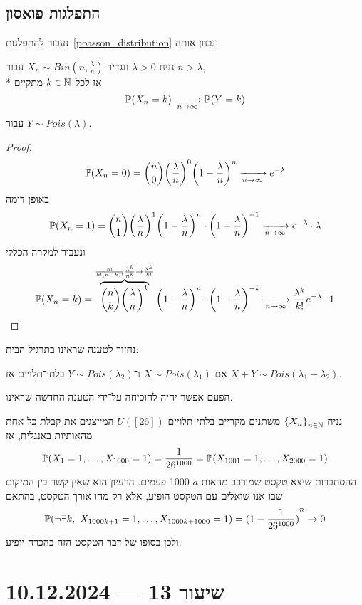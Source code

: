 \subsection{התפלגות פואסון}
נעבור להתפלגות\ \ref{poasson_distribution} ונבחן אותה
\begin{proposition}
	נניח $\lambda > 0$ ונגדיר $X_n \sim Bin(n, \frac{\lambda}{n})$ עבור $n > \lambda$, \\*
	אז לכל $k \in \mathbb{N}$ מתקיים
	\[
		\mathbb{P}(X_n = k) \xrightarrow[n \to \infty]{} \mathbb{P}(Y = k)
	\]
	עבור $Y \sim Pois(\lambda)$.
\end{proposition}
\begin{proof}
	\[
		\mathbb{P}(X_n = 0)
		= \binom{n}{0} {\left(\frac{\lambda}{n}\right)}^0 {\left(1 - \frac{\lambda}{n}\right)}^n \xrightarrow[n \to \infty]{} e^{-\lambda}
	\]
	באופן דומה
	\[
		\mathbb{P}(X_n = 1)
		= \binom{n}{1} {\left(\frac{\lambda}{n}\right)}^1 {\left(1 - \frac{\lambda}{n}\right)}^n \cdot {\left(1 - \frac{\lambda}{n}\right)}^{-1} \xrightarrow[n \to \infty]{} e^{-\lambda} \cdot \lambda
	\]
	ונעבור למקרה הכללי
	\[
		\mathbb{P}(X_n = k)
		= \overbrace{\binom{n}{k} {\left(\frac{\lambda}{n}\right)}^k}^{\frac{n!}{k! (n - k)!} \frac{\lambda^k}{n^k} \to \frac{\lambda^k}{k!}} {\left(1 - \frac{\lambda}{n}\right)}^n \cdot {\left(1 - \frac{\lambda}{n}\right)}^{-k}
		\xrightarrow[n \to \infty]{} \frac{\lambda^k}{k!} e^{-\lambda} \cdot 1
	\]
\end{proof}
נחזור לטענה שראינו בתרגיל הבית:
\begin{proposition}
	אם $X \sim Pois(\lambda_1)$ ו־$Y \sim Pois(\lambda_2)$ בלתי־תלויים אז $X + Y \sim Pois(\lambda_1 + \lambda_2)$.
\end{proposition}
הפעם אפשר יהיה להוכיחה על־ידי הטענה החדשה שראינו.
\begin{example}
	נניח ${\{X_n\}}_{n \in \mathbb{N}}$ משתנים מקריים בלתי־תלויים $U([26])$ המייצגים את קבלת כל אחת מהאותיות באנגלית, אז
	\[
		\mathbb{P}(X_1 = 1, \dots, X_{1000} = 1) = \frac{1}{26^{1000}} = \mathbb{P}(X_{1001} = 1, \dots, X_{2000} = 1)
	\]
	ההסתברות שיצא טקסט שמורכב מהאות $a$ 1000 פעמים.
	הרעיון הוא שאין קשר בין המיקום שבו אנו שואלים עם הטקסט הופיע, אלא רק מהו אורך הטקסט, בהתאם
	\[
		\mathbb{P}(\lnot \exists k,\ X_{1000 k + 1} = 1, \dots, X_{1000k + 1000} = 1)
		= {(1 - \frac{1}{26^{1000}})}^n
		\to 0
	\]
	ולכן בסופו של דבר הטקסט הזה בהכרח יופיע.
\end{example}

\section{שיעור 13 --- 10.12.2024}
